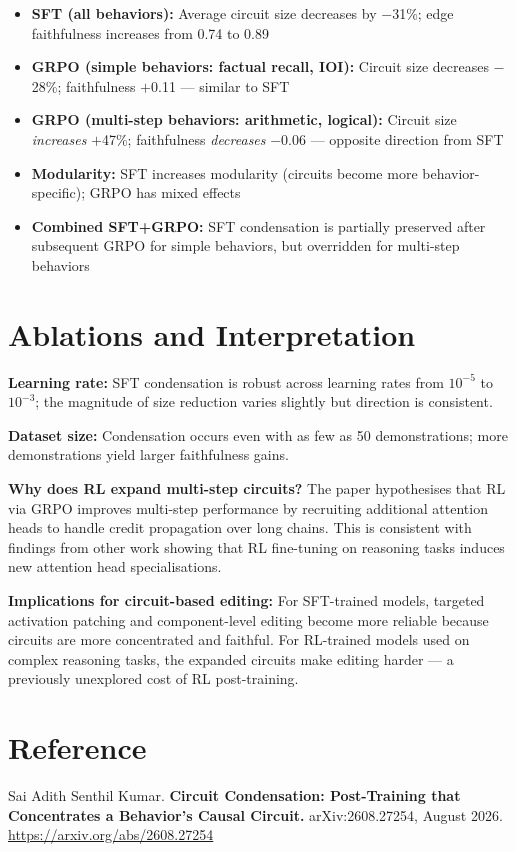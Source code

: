 \documentclass[10pt,twocolumn]{article}
\begin{document}
\begin{itemize}[itemsep=2pt,parsep=0pt]
  \item \textbf{SFT (all behaviors):} Average circuit size decreases
    by $-$31\%; edge faithfulness increases from 0.74 to 0.89
  \item \textbf{GRPO (simple behaviors: factual recall, IOI):}
    Circuit size decreases $-$28\%; faithfulness $+$0.11 — similar
    to SFT
  \item \textbf{GRPO (multi-step behaviors: arithmetic, logical):}
    Circuit size \emph{increases} $+$47\%; faithfulness \emph{decreases}
    $-$0.06 — opposite direction from SFT
  \item \textbf{Modularity:} SFT increases modularity (circuits become
    more behavior-specific); GRPO has mixed effects
  \item \textbf{Combined SFT+GRPO:} SFT condensation is partially
    preserved after subsequent GRPO for simple behaviors, but
    overridden for multi-step behaviors
\end{itemize}

\section{Ablations and Interpretation}

\textbf{Learning rate:} SFT condensation is robust across learning
rates from $10^{-5}$ to $10^{-3}$; the magnitude of size reduction
varies slightly but direction is consistent.

\textbf{Dataset size:} Condensation occurs even with as few as 50
demonstrations; more demonstrations yield larger faithfulness gains.

\textbf{Why does RL expand multi-step circuits?} The paper hypothesises
that RL via GRPO improves multi-step performance by recruiting
additional attention heads to handle credit propagation over long
chains. This is consistent with findings from other work showing
that RL fine-tuning on reasoning tasks induces new attention head
specialisations.

\textbf{Implications for circuit-based editing:} For SFT-trained
models, targeted activation patching and component-level editing
become more reliable because circuits are more concentrated and
faithful. For RL-trained models used on complex reasoning tasks,
the expanded circuits make editing harder — a previously unexplored
cost of RL post-training.

\section*{Reference}

Sai Adith Senthil Kumar.
\textbf{Circuit Condensation: Post-Training that Concentrates
a Behavior's Causal Circuit.}
arXiv:2608.27254, August 2026.
\url{https://arxiv.org/abs/2608.27254}
\end{document}
